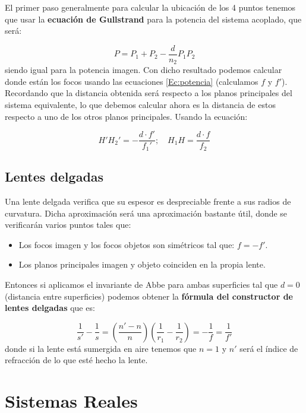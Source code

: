 \documentclass[12pt]{article}
\newcommand{\parentesis}[1]{\left( #1  \right)}
\numberwithin{equation}{section}
\numberwithin{figure}{section}
\begin{document}
El primer paso generalmente para calcular la ubicación de los 4 puntos tenemos que usar la \textbf{ecuación de Gullstrand} para la potencia del sistema acoplado, que será:

\begin{equation}
P = P_1 + P_2 - \dfrac{d}{n_2} P_1 P_2
\end{equation}
siendo igual para la potencia imagen. Con dicho resultado podemos calcular donde están los focos usando las ecuaciones \ref{Ec:potencia} (calculamos $f$ y $f'$). Recordando que la distancia obtenida será respecto a los planos principales del sistema equivalente, lo que debemos calcular ahora es la distancia de estos respecto a uno de los otros planos principales. Usando la ecuación:

\begin{equation}
H'H_2' = - \dfrac{d \cdot f'}{f_1'}; \quad H_1 H = \dfrac{d \cdot f}{f_2} 
\end{equation}
\subsection{Lentes delgadas}
Una lente delgada verifica que su espesor es despreciable frente a sus radios de curvatura. Dicha aproximación será una aproximación bastante útil, donde se verificarán varios puntos tales que:

\begin{itemize}
\item Los focos imagen y los focos objetos son simétricos tal que: $f = - f'$.
\item Los planos principales imagen y objeto coinciden en la propia lente.
\end{itemize}

Entonces si aplicamos el invariante de Abbe para ambas superficies tal que $d=0$ (distancia entre superficies) podemos obtener la \textbf{fórmula del constructor de lentes delgadas} que es:

\begin{equation}
\dfrac{1}{s'}-\dfrac{1}{s} =  \parentesis{\dfrac{n'-n}{n}} \parentesis{\dfrac{1}{r_1}-\dfrac{1}{r_2}} = - \dfrac{1}{f} = \dfrac{1}{f'}
\end{equation}
donde si la lente está sumergida en aire tenemos que $n=1$ y $n'$ será el índice de refracción de lo que esté hecho la lente.

\newpage

\section{Sistemas Reales}
\end{document}
